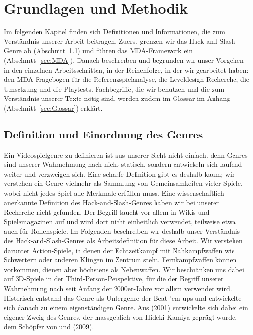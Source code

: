 \documentclass[../Main.tex]{subfiles}
\begin{document}
\section{Grundlagen und Methodik} \label{sec:Grundlagen}
Im folgenden Kapitel finden sich Definitionen und Informationen, die zum Verständnis unserer Arbeit beitragen. Zuerst grenzen wir das Hack-and-Slash-Genre ab (Abschnitt~\ref{sec:Genredefinition}) und führen das MDA-Framework ein (Abschnitt~\ref{sec:MDA}). Danach beschreiben und begründen wir unser Vorgehen in den einzelnen Arbeitsschritten, in der Reihenfolge, in der wir gearbeitet haben: den MDA-Fragebogen für die Referenzspielanalyse, die Leveldesign-Recherche, die Umsetzung und die Playtests. Fachbegriffe, die wir benutzen und die zum Verständnis unserer Texte nötig sind, werden zudem im Glossar im Anhang (Abschnitt~\ref{sec:Glossar}) erklärt.

\subsection{Definition und Einordnung des Genres} \label{sec:Genredefinition}
Ein Videospielgenre zu definieren ist aus unserer Sicht nicht einfach, denn Genres sind unserer Wahrnehmung nach nicht statisch, sondern entwickeln sich laufend weiter und verzweigen sich. Eine scharfe Definition gibt es deshalb kaum; wir verstehen ein Genre vielmehr als Sammlung von Gemeinsamkeiten vieler Spiele, wobei nicht jedes Spiel alle Merkmale erfüllen muss. Eine wissenschaftlich anerkannte Definition des Hack-and-Slash-Genres haben wir bei unserer Recherche nicht gefunden. Der Begriff taucht vor allem in Wikis und Spielemagazinen auf und wird dort nicht einheitlich verwendet, teilweise etwa auch für Rollenspiele.\autocite{wikipedia_hackandslash} Im Folgenden beschreiben wir deshalb unser Verständnis des Hack-and-Slash-Genres als Arbeitsdefinition für diese Arbeit. Wir verstehen darunter Action-Spiele, in denen der Echtzeitkampf mit Nahkampfwaffen wie Schwertern oder anderen Klingen im Zentrum steht. Fernkampfwaffen können vorkommen, dienen aber höchstens als Nebenwaffen. Wir beschränken uns dabei auf 3D-Spiele in der Third-Person-Perspektive, für die der Begriff unserer Wahrnehmung nach seit Anfang der 2000er-Jahre vor allem verwendet wird. Historisch entstand das Genre als Untergenre der Beat 'em ups und entwickelte sich danach zu einem eigenständigen Genre.\autocite{wikipedia_hackandslash} Aus  (2001)\autocite{capcom_devilmaycry_2001} entwickelte sich dabei ein eigener Zweig des Genres, der massgeblich von Hideki Kamiya geprägt wurde, dem Schöpfer von  und  (2009)\autocite{platinumgames_bayonetta_2009}.\autocite{wikipedia_hackandslash}
\end{document}
